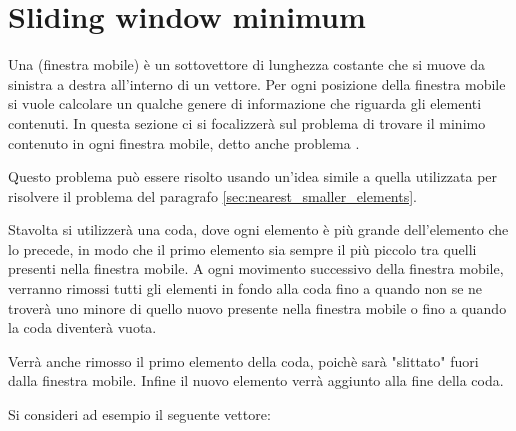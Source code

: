 \section{Sliding window minimum}


Una  (finestra mobile) è un sottovettore di lunghezza costante
che si muove da sinistra a destra all'interno di un vettore.
Per ogni posizione della finestra mobile
si vuole calcolare un qualche genere di informazione
che riguarda gli elementi contenuti.
In questa sezione ci si focalizzerà
sul problema di trovare il minimo contenuto
in ogni finestra mobile, detto anche problema
.

Questo problema può essere risolto usando
un'idea simile a quella utilizzata per risolvere il 
problema del paragrafo \ref{sec:nearest_smaller_elements}.

Stavolta si utilizzerà una coda,
dove ogni elemento è più grande dell'elemento che lo precede,
in modo che il primo elemento sia sempre il più piccolo
tra quelli presenti nella finestra mobile.
A ogni movimento successivo della finestra mobile,
verranno rimossi tutti gli elementi in fondo alla coda 
fino a quando non se ne troverà uno minore di quello
nuovo presente nella finestra mobile o fino a quando 
la coda diventerà vuota.

Verrà anche rimosso il primo elemento della coda,
poichè sarà "slittato" fuori dalla finestra mobile.
Infine il nuovo elemento verrà aggiunto alla fine 
della coda.

Si consideri ad esempio il seguente vettore:

\begin{center}
\end{center}

